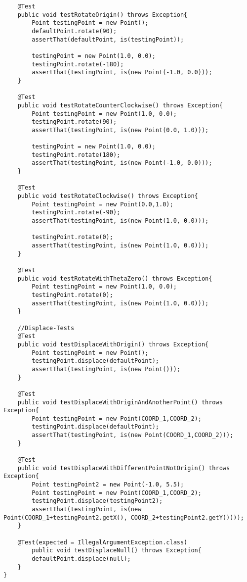 \begin{lstlisting}
	@Test
	public void testRotateOrigin() throws Exception{
		Point testingPoint = new Point();
		defaultPoint.rotate(90);
		assertThat(defaultPoint, is(testingPoint));
	
		testingPoint = new Point(1.0, 0.0);
		testingPoint.rotate(-180);
		assertThat(testingPoint, is(new Point(-1.0, 0.0)));
	}
	
	@Test
	public void testRotateCounterClockwise() throws Exception{
		Point testingPoint = new Point(1.0, 0.0);
		testingPoint.rotate(90);
		assertThat(testingPoint, is(new Point(0.0, 1.0)));
		
		testingPoint = new Point(1.0, 0.0);
		testingPoint.rotate(180);
		assertThat(testingPoint, is(new Point(-1.0, 0.0)));
	}
	
	@Test
	public void testRotateClockwise() throws Exception{
		Point testingPoint = new Point(0.0,1.0);
		testingPoint.rotate(-90);
		assertThat(testingPoint, is(new Point(1.0, 0.0)));
		
		testingPoint.rotate(0);
		assertThat(testingPoint, is(new Point(1.0, 0.0)));
	}
	
	@Test
	public void testRotateWithThetaZero() throws Exception{
		Point testingPoint = new Point(1.0, 0.0);
		testingPoint.rotate(0);
		assertThat(testingPoint, is(new Point(1.0, 0.0)));
	}
	
	//Displace-Tests
	@Test
	public void testDisplaceWithOrigin() throws Exception{
		Point testingPoint = new Point();
		testingPoint.displace(defaultPoint);
		assertThat(testingPoint, is(new Point()));
	}
	
	@Test
	public void testDisplaceWithOriginAndAnotherPoint() throws Exception{
		Point testingPoint = new Point(COORD_1,COORD_2);
		testingPoint.displace(defaultPoint);
		assertThat(testingPoint, is(new Point(COORD_1,COORD_2)));
	}
	
	@Test
	public void testDisplaceWithDifferentPointNotOrigin() throws Exception{
		Point testingPoint2 = new Point(-1.0, 5.5);
		Point testingPoint = new Point(COORD_1,COORD_2);
		testingPoint.displace(testingPoint2);
		assertThat(testingPoint, is(new Point(COORD_1+testingPoint2.getX(), COORD_2+testingPoint2.getY())));
	}
	
	@Test(expected = IllegalArgumentException.class)
		public void testDisplaceNull() throws Exception{
		defaultPoint.displace(null);
	}
}
\end{lstlisting}

\pagebreak

